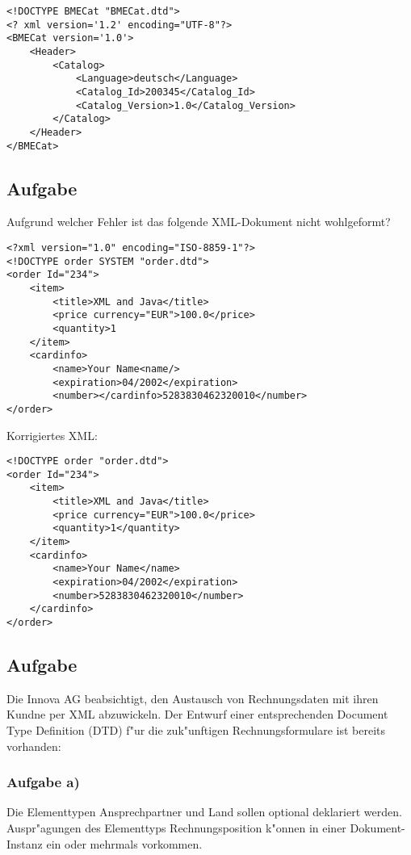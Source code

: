 \lstset{language=XML}
\begin{lstlisting}
<!DOCTYPE BMECat "BMECat.dtd">
<? xml version='1.2' encoding="UTF-8"?>
<BMECat version='1.0'>
    <Header>
        <Catalog>
            <Language>deutsch</Language>
            <Catalog_Id>200345</Catalog_Id>
            <Catalog_Version>1.0</Catalog_Version>
        </Catalog>
    </Header>
</BMECat>
\end{lstlisting}




\subsection{Aufgabe}
Aufgrund welcher Fehler ist das folgende XML-Dokument nicht wohlgeformt?

\lstset{language=XML}
\begin{lstlisting}
<?xml version="1.0" encoding="ISO-8859-1"?>
<!DOCTYPE order SYSTEM "order.dtd">
<order Id="234">
    <item>
        <title>XML and Java</title>
        <price currency="EUR">100.0</price>
        <quantity>1
    </item>
    <cardinfo>
        <name>Your Name<name/>
        <expiration>04/2002</expiration>
        <number></cardinfo>5283830462320010</number>
</order>
\end{lstlisting}

Korrigiertes XML:
\lstset{language=XML}
\begin{lstlisting}
<!DOCTYPE order "order.dtd">
<order Id="234">
    <item>
        <title>XML and Java</title>
        <price currency="EUR">100.0</price>
        <quantity>1</quantity>
    </item>
    <cardinfo>
        <name>Your Name</name>
        <expiration>04/2002</expiration>
        <number>5283830462320010</number>
    </cardinfo>
</order>
\end{lstlisting}


\subsection{Aufgabe}

Die Innova AG beabsichtigt, den Austausch von Rechnungsdaten mit ihren Kundne per XML abzuwickeln.
Der Entwurf einer entsprechenden Document Type Definition (DTD) f"ur die zuk"unftigen Rechnungsformulare ist bereits vorhanden:

\subsubsection{Aufgabe a)}
Die Elementtypen Ansprechpartner und Land sollen optional deklariert werden.
Auspr"agungen des Elementtyps Rechnungsposition k"onnen in einer Dokument-Instanz ein oder mehrmals vorkommen.\\

